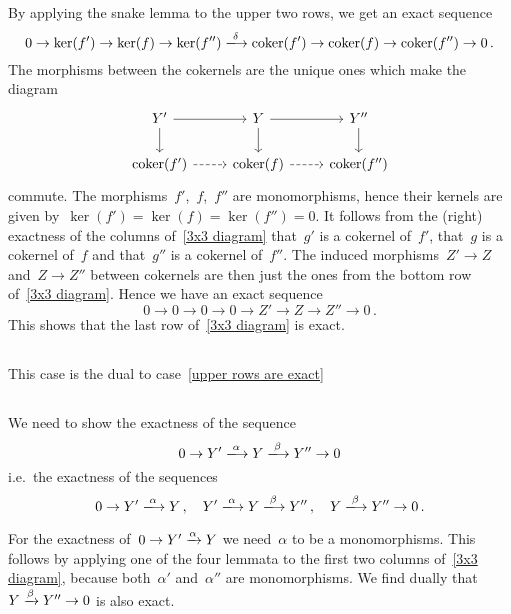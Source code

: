 By applying the snake lemma to the upper two rows, we get an exact sequence
\[
  0
  \to
  \ker(f')
  \to
  \ker(f)
  \to
  \ker(f'')
  \xlongto{\delta}
  \coker(f')
  \to
  \coker(f)
  \to
  \coker(f'')
  \to
  0 \,.
\]
The morphisms between the cokernels are the unique ones which make the diagram
\[
  \begin{tikzcd}
      Y'
      \arrow{r}
      \arrow{d}
    & Y
      \arrow{r}
      \arrow{d}
    & Y''
      \arrow{d}
    \\
      \coker(f')
      \arrow[dashed]{r}
    & \coker(f)
      \arrow[dashed]{r}
    & \coker(f'')
  \end{tikzcd}
\]
commute.
The morphisms~$f'$,~$f$,~$f''$ are monomorphisms, hence their kernels are given by~$\ker(f') = \ker(f) = \ker(f'') = 0$.
It follows from the (right) exactness of the columns of~\eqref{3x3 diagram} that~$g'$ is a cokernel of~$f'$, that~$g$ is a cokernel of~$f$ and that~$g''$ is a cokernel of~$f''$.
The induced morphisms~$Z' \to Z$ and~$Z \to Z''$ between cokernels are then just the ones from the bottom row of~\eqref{3x3 diagram}.
Hence we have an exact sequence
\[
  0
  \to
  0
  \to
  0
  \to
  0
  \to
  Z'
  \to
  Z
  \to 
  Z''
  \to
  0 \,.
\]
This shows that the last row of~\eqref{3x3 diagram} is exact.





\subsection{}

This case is the dual to case~\ref{upper rows are exact}





\subsection{}

We need to show the exactness of the sequence
\[
  0
  \to
  Y'
  \xlongto{\alpha}
  Y
  \xlongto{\beta}
  Y''
  \to
  0
\]
i.e.\ the exactness of the sequences
\[
  0 \to Y' \xlongto{\alpha} Y \,,
  \quad
  Y' \xlongto{\alpha} Y \xlongto{\beta} Y'' \,,
  \quad
  Y \xlongto{\beta} Y'' \to 0 \,.
\]

For the exactness of~$0 \to Y' \xrightarrow{\alpha} Y$ we need~$\alpha$ to be a monomorphisms.
This follows by applying one of the four lemmata to the first two columns of~\eqref{3x3 diagram}, because both~$\alpha'$ and~$\alpha''$ are monomorphisms.
We find dually that~$Y \xrightarrow{\beta} Y'' \to 0$ is also exact.

